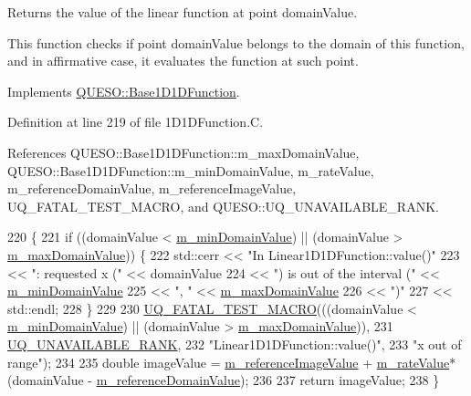 Returns the value of the linear function at point {\ttfamily domain\-Value}. 

This function checks if point {\ttfamily domain\-Value} belongs to the domain of {\ttfamily this} function, and in affirmative case, it evaluates the function at such point. 

Implements \hyperlink{class_q_u_e_s_o_1_1_base1_d1_d_function_a1042dfd930c30a35d6dbf70f94e8dfe5}{Q\-U\-E\-S\-O\-::\-Base1\-D1\-D\-Function}.



Definition at line 219 of file 1\-D1\-D\-Function.\-C.



References Q\-U\-E\-S\-O\-::\-Base1\-D1\-D\-Function\-::m\-\_\-max\-Domain\-Value, Q\-U\-E\-S\-O\-::\-Base1\-D1\-D\-Function\-::m\-\_\-min\-Domain\-Value, m\-\_\-rate\-Value, m\-\_\-reference\-Domain\-Value, m\-\_\-reference\-Image\-Value, U\-Q\-\_\-\-F\-A\-T\-A\-L\-\_\-\-T\-E\-S\-T\-\_\-\-M\-A\-C\-R\-O, and Q\-U\-E\-S\-O\-::\-U\-Q\-\_\-\-U\-N\-A\-V\-A\-I\-L\-A\-B\-L\-E\-\_\-\-R\-A\-N\-K.


\begin{DoxyCode}
220 \{
221   \textcolor{keywordflow}{if} ((domainValue < \hyperlink{class_q_u_e_s_o_1_1_base1_d1_d_function_a7b18b3854ee74ef5befbc67b75ebbdc5}{m\_minDomainValue}) || (domainValue > 
      \hyperlink{class_q_u_e_s_o_1_1_base1_d1_d_function_aa0025999ccab2145cd46c0a81e260e8f}{m\_maxDomainValue})) \{
222     std::cerr << \textcolor{stringliteral}{"In Linear1D1DFunction::value()"}
223               << \textcolor{stringliteral}{": requested x ("}            << domainValue
224               << \textcolor{stringliteral}{") is out of the interval ("} << \hyperlink{class_q_u_e_s_o_1_1_base1_d1_d_function_a7b18b3854ee74ef5befbc67b75ebbdc5}{m\_minDomainValue}
225               << \textcolor{stringliteral}{", "}                         << \hyperlink{class_q_u_e_s_o_1_1_base1_d1_d_function_aa0025999ccab2145cd46c0a81e260e8f}{m\_maxDomainValue}
226               << \textcolor{stringliteral}{")"}
227               << std::endl;
228   \}
229 
230   \hyperlink{_defines_8h_a56d63d18d0a6d45757de47fcc06f574d}{UQ\_FATAL\_TEST\_MACRO}(((domainValue < \hyperlink{class_q_u_e_s_o_1_1_base1_d1_d_function_a7b18b3854ee74ef5befbc67b75ebbdc5}{m\_minDomainValue}) || (domainValue 
      > \hyperlink{class_q_u_e_s_o_1_1_base1_d1_d_function_aa0025999ccab2145cd46c0a81e260e8f}{m\_maxDomainValue})),
231                       \hyperlink{namespace_q_u_e_s_o_a7d4679800a430ae8e473c1c7bc0bfb21}{UQ\_UNAVAILABLE\_RANK},
232                       \textcolor{stringliteral}{"Linear1D1DFunction::value()"},
233                       \textcolor{stringliteral}{"x out of range"});
234 
235   \textcolor{keywordtype}{double} imageValue = \hyperlink{class_q_u_e_s_o_1_1_linear1_d1_d_function_abb210b107ac3ad9473b8c597808b1ba9}{m\_referenceImageValue} + \hyperlink{class_q_u_e_s_o_1_1_linear1_d1_d_function_aa593d204ade4bf240d0353eaf9f10fd0}{m\_rateValue}*(domainValue - 
      \hyperlink{class_q_u_e_s_o_1_1_linear1_d1_d_function_a9ff67ad29df205d2c78e3431b062ccb2}{m\_referenceDomainValue});
236 
237   \textcolor{keywordflow}{return} imageValue;
238 \}
\end{DoxyCode}


